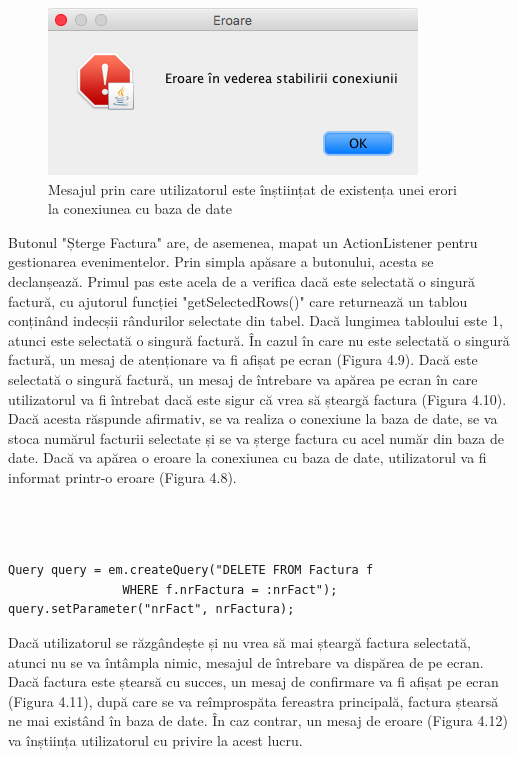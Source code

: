 \documentclass[12pt]{book}
\begin{document}
\begin{figure}[!ht]
	\centering
	\includegraphics{EroareConexiune}
	\caption{Mesajul prin care utilizatorul este înștiințat de existența unei erori la conexiunea cu baza de date}
\end{figure}

Butonul "Șterge Factura" are, de asemenea, mapat un ActionListener pentru gestionarea evenimentelor. Prin simpla apăsare a butonului, acesta se declanșează. Primul pas este acela de a verifica dacă este selectată o singură factură, cu ajutorul funcției "getSelectedRows()" care returnează un tablou conținând indecșii rândurilor selectate din tabel. Dacă lungimea tabloului este 1, atunci este selectată o singură factură. În cazul în care nu este selectată o singură factură, un mesaj de atenționare va fi afișat pe ecran (Figura 4.9). Dacă este selectată o singură factură, un mesaj de întrebare va apărea pe ecran în care utilizatorul va fi întrebat dacă este sigur că vrea să șteargă factura (Figura 4.10). Dacă acesta răspunde afirmativ, se va realiza o conexiune la baza de date, se va stoca numărul facturii selectate și se va șterge factura cu acel număr din baza de date. Dacă va apărea o eroare la conexiunea cu baza de date, utilizatorul va fi informat printr-o eroare (Figura 4.8). \\\\\\\\

\begin{lstlisting}[frame=single, caption=Ștergerea unei facturi din baza de date]
Query query = em.createQuery("DELETE FROM Factura f
				WHERE f.nrFactura = :nrFact");
query.setParameter("nrFact", nrFactura);
\end{lstlisting}

Dacă utilizatorul se răzgândește și nu vrea să mai șteargă factura selectată, atunci nu se va întâmpla nimic, mesajul de întrebare va dispărea de pe ecran. Dacă factura este ștearsă cu succes, un mesaj de confirmare va fi afișat pe ecran (Figura 4.11), după care se va reîmprospăta fereastra principală, factura ștearsă ne mai existând în baza de date. În caz contrar, un mesaj de eroare (Figura 4.12) va înștiința utilizatorul cu privire la acest lucru.
\end{document}
